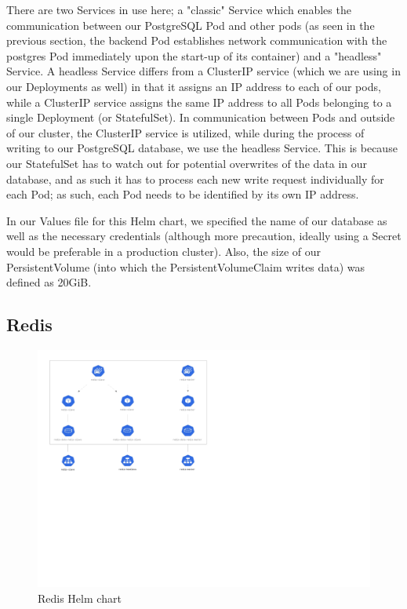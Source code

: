 \documentclass[thesis=B,english]{FITthesis}[2019/12/23]
\begin{document}
There are two Services in use here; a "classic" Service which enables the communication between our PostgreSQL Pod and other pods (as seen in the previous section, the backend Pod establishes network communication with the postgres Pod immediately upon the start-up of its container) and a "headless" Service. A headless Service differs from a ClusterIP service (which we are using in our Deployments as well) in that it assigns an IP address to each of our pods, while a ClusterIP service assigns the same IP address to all Pods belonging to a single Deployment (or StatefulSet). \cite{kube-action} In communication between Pods and outside of our cluster, the ClusterIP service is utilized, while during the process of writing to our PostgreSQL database, we use the headless Service. This is because our StatefulSet has to watch out for potential overwrites of the data in our database, and as such it has to process each new write request individually for each Pod; as such, each Pod needs to be identified by its own IP address.

In our Values file for this Helm chart, we specified the name of our database as well as the necessary credentials (although more precaution, ideally using a Secret would be preferable in a production cluster). Also, the size of our PersistentVolume (into which the PersistentVolumeClaim writes data) was defined as 20GiB.

\subsection{Redis}

\begin{figure}[H]
\centering
\caption{Redis Helm chart}
\hspace*{-4.4cm}
\includegraphics[scale=0.5]{redis-diagram}
\end{figure}
\end{document}
